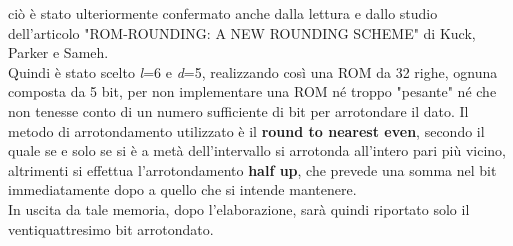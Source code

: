 \documentclass[a4paper, titlepage]{article}
\begin{document}
ciò è stato ulteriormente confermato anche dalla lettura e dallo studio dell'articolo "ROM-ROUNDING: A NEW ROUNDING SCHEME" di Kuck, Parker e Sameh.
\\Quindi è stato scelto \textit{l}=6 e \textit{d}=5, realizzando così una ROM da 32 righe, ognuna composta da 5 bit, per non implementare una ROM né troppo "pesante" né che non tenesse conto di un numero sufficiente di bit per arrotondare il dato. Il metodo di arrotondamento utilizzato è il \textbf{round to nearest even}, secondo il quale se e solo se si è a metà dell'intervallo si arrotonda all'intero pari più vicino, altrimenti si effettua l'arrotondamento \textbf{half up}, che prevede una somma nel bit immediatamente dopo a quello che si intende mantenere.\\In uscita da tale memoria, dopo l'elaborazione, sarà quindi riportato solo il ventiquattresimo bit arrotondato.
\end{document}
